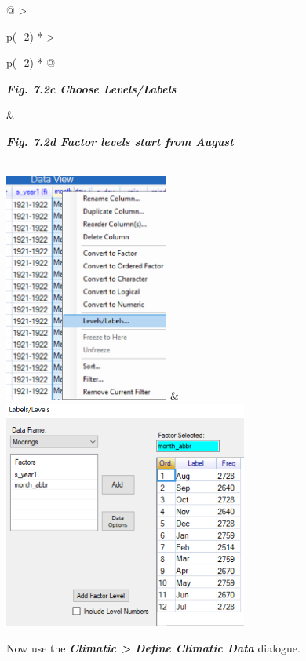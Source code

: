 \documentclass[
  letterpaper,
  DIV=11,
  numbers=noendperiod]{scrreprt}
\begin{document}
\begin{longtable}[]{@{}
  >{\raggedright\arraybackslash}p{(\columnwidth - 2\tabcolsep) * }
  >{\raggedright\arraybackslash}p{(\columnwidth - 2\tabcolsep) * }@{}}
\toprule\noalign{}
\begin{minipage}[b]{\linewidth}\raggedright
\textbf{\emph{Fig. 7.2c Choose Levels/Labels}}
\end{minipage} & \begin{minipage}[b]{\linewidth}\raggedright
\textbf{\emph{Fig. 7.2d Factor levels start from August}}
\end{minipage} \\
\midrule\noalign{}
\endhead
\bottomrule\noalign{}
\endlastfoot
\includegraphics[width=2.12964in,height=2.97015in]{figures/Fig7.2c.png}
&
\includegraphics[width=3.15733in,height=2.95211in]{figures/Fig7.2d.png} \\
\end{longtable}

Now use the \textbf{\emph{Climatic \textgreater{} Define Climatic Data}}
dialogue.
\end{document}
